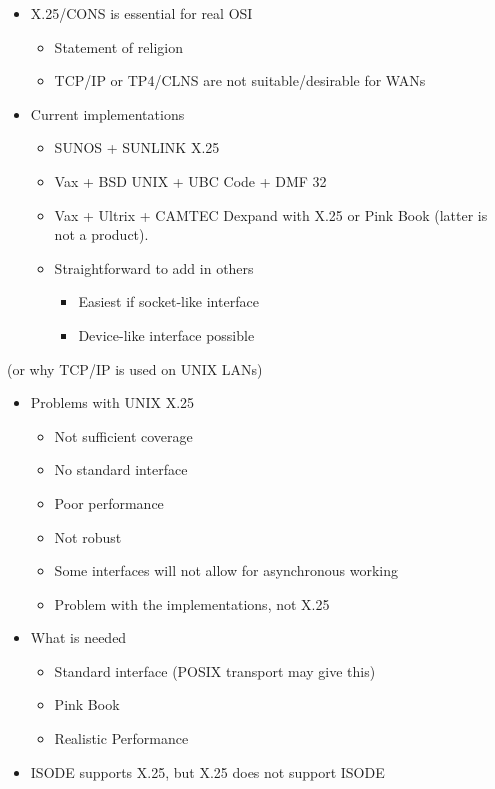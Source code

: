 \begin {bwslide}
\begin {itemize}

\item X.25/CONS is essential for real OSI 
\begin {itemize}
\item Statement of religion
\item TCP/IP or TP4/CLNS are not suitable/desirable for WANs
\end {itemize}

\item Current implementations
\begin {itemize}
\item SUNOS + SUNLINK X.25
\item Vax + BSD UNIX + UBC Code + DMF 32
\item Vax + Ultrix + CAMTEC Dexpand with X.25 or Pink Book (latter is not a
product).    
\item Straightforward to add in others
\begin {itemize}
\item Easiest if socket-like interface
\item Device-like interface possible
\end {itemize}

\end {itemize}
\end {itemize}
\end {bwslide}


\begin {bwslide}

(or why TCP/IP is used on UNIX LANs)


\begin {itemize}

\item Problems with UNIX X.25
\begin {itemize}
\item Not sufficient coverage
\item No standard interface
\item Poor performance
\item Not robust
\item Some interfaces will not allow for asynchronous working 
\item Problem with the implementations, not X.25
\end {itemize}

\item What is needed
\begin {itemize}
\item Standard interface (POSIX transport may give this)
\item Pink Book
\item Realistic Performance
\end {itemize}

\item ISODE supports X.25, but X.25 does not support ISODE

\end {itemize}
\end {bwslide}

